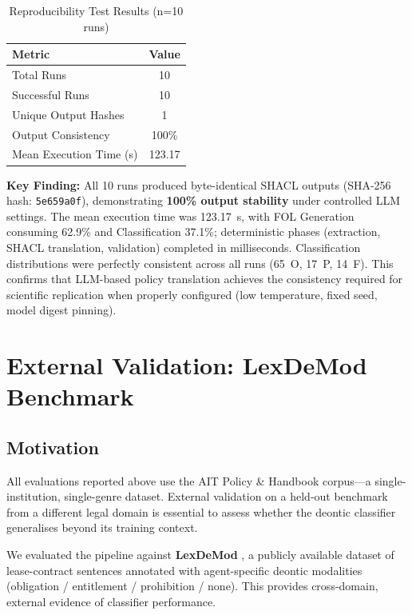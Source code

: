 \begin{table}[htbp]
\centering
\caption{Reproducibility Test Results (n=10 runs)}
\label{tab:reproducibility-metrics}
\begin{tabular}{lc}
\toprule
\textbf{Metric} & \textbf{Value} \\
\midrule
Total Runs & 10 \\
Successful Runs & 10 \\
Unique Output Hashes & 1 \\
Output Consistency & 100\% \\
Mean Execution Time (s) & 123.17 \\
\bottomrule
\end{tabular}
\end{table}

\textbf{Key Finding:} All 10 runs produced byte-identical SHACL outputs (SHA-256 hash: \texttt{5e659a0f}), demonstrating \textbf{100\% output stability} under controlled LLM settings. The mean execution time was 123.17~s, with FOL Generation consuming 62.9\% and Classification 37.1\%; deterministic phases (extraction, SHACL translation, validation) completed in milliseconds. Classification distributions were perfectly consistent across all runs (65~O, 17~P, 14~F). This confirms that LLM-based policy translation achieves the consistency required for scientific replication when properly configured (low temperature, fixed seed, model digest pinning).

\section{External Validation: LexDeMod Benchmark}
\label{sec:lexdemod-validation}

\subsection{Motivation}

All evaluations reported above use the AIT Policy \& Handbook corpus---a single-institution, single-genre dataset. External validation on a held-out benchmark from a different legal domain is essential to assess whether the deontic classifier generalises beyond its training context.

We evaluated the pipeline against \textbf{LexDeMod} \citep{sancheti2022agent}, a publicly available dataset of lease-contract sentences annotated with agent-specific deontic modalities (obligation / entitlement / prohibition / none). This provides cross-domain, external evidence of classifier performance.

